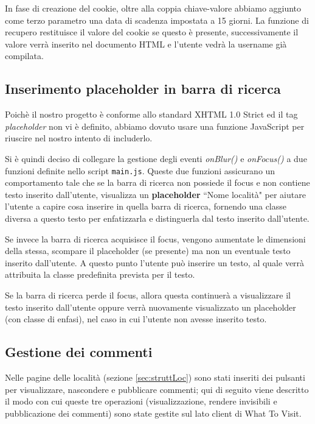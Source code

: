 In fase di creazione del cookie, oltre alla coppia chiave-valore abbiamo
aggiunto come terzo parametro una data di scadenza impostata a 15 giorni.
La funzione di recupero restituisce il valore del cookie se questo è presente,
successivamente il valore verrà inserito nel documento HTML e l'utente vedrà
la username già compilata.

\subsection{Inserimento placeholder in barra di ricerca}

Poichè il nostro progetto è conforme allo standard XHTML 1.0 Strict ed  il tag
\textit{placeholder} non vi è definito, abbiamo dovuto usare una funzione
JavaScript per riuscire nel nostro intento di includerlo.


Si è quindi deciso di collegare la gestione degli eventi \textit{onBlur()} e
\textit{onFocus()} a due funzioni definite nello script \texttt{main.js}.
Queste due funzioni assicurano un comportamento tale che se la barra di ricerca
non possiede il focus e non contiene testo inserito dall'utente, visualizza un
\textbf{placeholder} ``Nome località" per aiutare l'utente a capire cosa
inserire in quella barra di ricerca, fornendo una classe diversa a questo
testo per enfatizzarla e distinguerla dal testo inserito dall'utente.

Se invece la barra di ricerca acquisisce il focus, vengono aumentate le
dimensioni della stessa, scompare il placeholder (se presente) ma non un
eventuale testo inserito dall'utente. A questo punto l'utente può inserire un
testo, al quale verrà attribuita la classe predefinita prevista per il testo.

Se la barra di ricerca perde il focus, allora questa continuerà a visualizzare
il testo inserito dall'utente oppure verrà nuovamente visualizzato un placeholder (con classe di enfasi), nel caso in cui l'utente non avesse
inserito testo.


\subsection{Gestione dei commenti}
Nelle pagine delle località (sezione \ref{sec:struttLoc}) sono stati
inseriti dei pulsanti per visualizzare, nascondere e pubblicare commenti; qui
di seguito viene descritto il modo con cui queste tre operazioni
(visualizzazione, rendere invisibili e pubblicazione dei commenti) sono state
gestite sul lato client di What To Visit.

